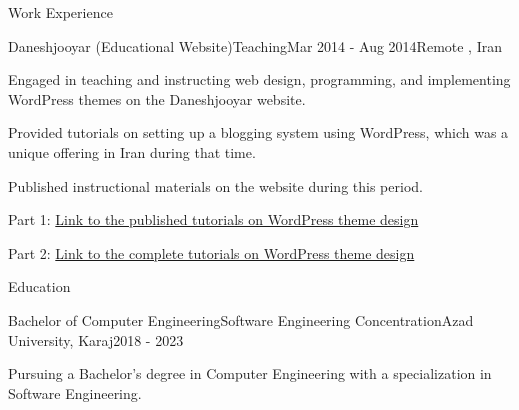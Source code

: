 \documentclass[]{kyvernitis-resume}
\begin{document}
\begin{section}{Work Experience}
 \begin{subsection}{Daneshjooyar (Educational Website)}{Teaching}{Mar 2014 - Aug 2014}{Remote , Iran}
	\item Engaged in teaching and instructing web design, programming, and implementing WordPress themes on the Daneshjooyar website.
	\item Provided tutorials on setting up a blogging system using WordPress, which was a unique offering in Iran during that time.
	\item Published instructional materials on the website during this period.
	\item Part 1:  \href{https://www.daneshjooyar.com/%d9%82%d8%b3%d9%85%d8%aa-%d9%86%d9%87%d8%a7%db%8c%db%8c-%d8%b3%d8%b1%db%8c-%d8%a2%d9%85%d9%88%d8%b2%d8%b4%db%8c-%d8%b7%d8%b1%d8%a7%d8%ad%db%8c-%d9%82%d8%a7%d9%84%d8%a8-%d9%88%d8%b1%d8%af%d9%be%d8%b1/}{Link to the published tutorials on WordPress theme design} 
	\item Part 2: \href{https://www.daneshjooyar.com/%d8%a2%d9%85%d9%88%d8%b2%d8%b4-%d8%b7%d8%b1%d8%a7%d8%ad%db%8c-%d9%82%d8%a7%d9%84%d8%a8-%d9%88%d8%b1%d8%af%d9%be%d8%b1%d8%b3-%d8%aa%d9%85%d8%a7%d9%85%db%8c-%d9%82%d8%b3%d9%85%d8%aa-%d9%87%d8%a7-%d9%82/}{Link to the complete tutorials on WordPress theme design}
    \end{subsection}
    
\end{section}

\begin{section}{Education}

\begin{subsectionnobullet}{Bachelor of Computer Engineering}{Software Engineering Concentration}{Azad University, Karaj}{2018 - 2023}
\item Pursuing a Bachelor's degree in Computer Engineering with a specialization in Software Engineering.
\end{subsectionnobullet}

\end{section}
\end{document}
